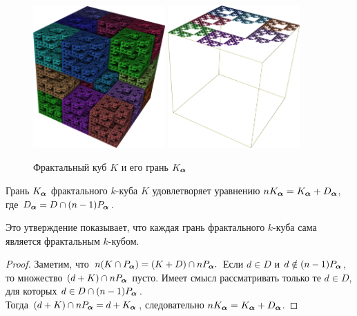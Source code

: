 \begin{figure}[h!]
\centering
\includegraphics[width=0.45\textwidth]{images/presentation/qK.png}
 \hfill
 \includegraphics[width=0.45\textwidth]{images/presentation/qK_a.png}
  \caption{Фрактальный куб $K$ и его грань $K_{\bm{\alpha}}$}
 \label{fig:qK_a}
\end{figure}

\begin{proposition}\label{prop:Ka}
Грань $K_{\bm{\alpha}}$ фрактального $k$-куба $K$ удовлетворяет уравнению $n K_{\bm{\alpha}}=K_{\bm{\alpha}}+D_{\bm{\alpha}}$, где $D_{\bm{\alpha}}=D\cap(n-1)P_{\bm{\alpha}}$.
\end{proposition}

Это утверждение показывает, что каждая грань фрактального $k$-куба сама является фрактальным $k$-кубом.

\begin{proof}
Заметим, что $n(K\cap P_{\bm{\alpha}})=(K+D)\cap nP_{\bm{\alpha}}.$ 
Если $d\in D$ и \linebreak $d\notin(n-1)P_{\bm{\alpha}}$, то множество $(d+K)\cap nP_{\bm{\alpha}}$ пусто.
Имеет смысл рассматривать только те $d\in D$, для которых $d\in D\cap (n-1)P_{\bm{\alpha}}$.\\ 
Тогда $(d+K)\cap nP_{\bm{\alpha}}=d+K_{\bm{\alpha}}$, следовательно $n K_{\bm{\alpha}}={K_{\bm{\alpha}}+D_{\bm{\alpha}}}$.
\end{proof}

